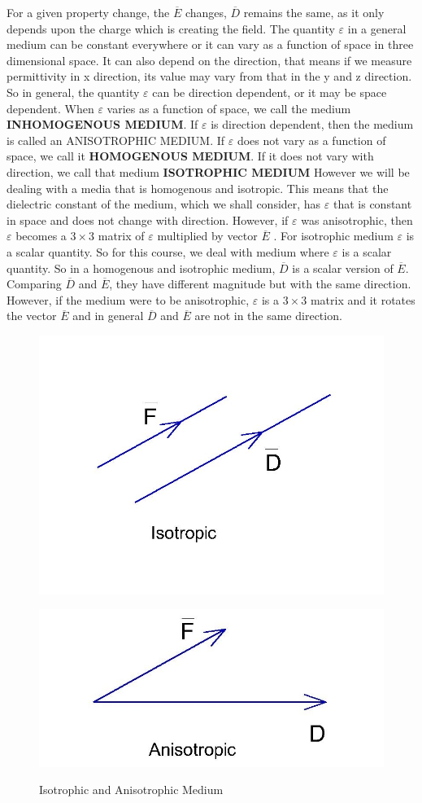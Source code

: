 For a given property change, the $\overline{E}$ changes, $\overline{D}$ remains the same, as it only depends upon the charge which is creating the field. The quantity $\varepsilon$ in a general medium can be constant everywhere or it can vary as a function of space in three dimensional space. It can also depend on the direction, that means if we measure permittivity in x direction, its value may vary from that in the y and z direction. So in general, the quantity  $\varepsilon$  can be direction dependent, or it may be space dependent. When  $\varepsilon$  varies as a function of space, we call the medium \textbf{INHOMOGENOUS MEDIUM}. If  $\varepsilon$  is direction dependent, then the medium is called an ANISOTROPHIC MEDIUM. If  $\varepsilon$ does not vary as a function of space, we call it \textbf{HOMOGENOUS MEDIUM}. If it does not vary with direction, we call that medium \textbf{ISOTROPHIC MEDIUM}
However we will be dealing with a media that is homogenous and isotropic. This means that the dielectric constant of the medium, which we shall consider, has  $\varepsilon$ that is constant in space and does not change with direction. However, if  $\varepsilon$  was anisotrophic, then  $\varepsilon$  becomes a $3\times 3$ matrix of  $\varepsilon$  multiplied by vector $\overline{E}$ . For isotrophic medium  $\varepsilon$  is a scalar quantity. So for this course, we deal with medium where  $\varepsilon$  is a scalar quantity.
So in a homogenous and isotrophic medium,  $\overline{D}$ is a scalar version of  $\overline{E}$. Comparing  $\overline{D}$ and  $\overline{E}$, they have different magnitude but with the same direction. However, if the medium were to be anisotrophic,  $\varepsilon$ is a $3\times 3$ matrix and it rotates the vector  $\overline{E}$ and in general  $\overline{D}$ and  $\overline{E}$ are not in the same direction.
\begin{figure}[h]
\centering
\begin{minipage}{.25\textwidth}
\centering
\includegraphics[width=.4\linewidth]{./graphics/fig178b}
\label{fig:fig178b}
\end{minipage}
\begin{minipage}{.25\textwidth}
\centering
 \includegraphics[width=.4\linewidth]{./graphics/fig178}
\label{fig:fig178a}
\end{minipage}
\caption{Isotrophic and Anisotrophic Medium}
\end{figure}

